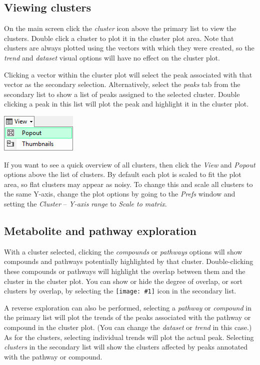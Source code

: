\documentclass[11pt,a4paper]{article}
\newcommand{\menu}[1]{ \flqq\textit{#1}\frqq}
\newcommand{\icon}[1]{\texttt{[image: \#1]}}
\begin{document}
\subsection{Viewing clusters}
On the main screen click the \menu{cluster} icon above the primary list to view the clusters. Double click a cluster to plot it in the cluster plot area. Note that clusters are always plotted using the vectors with which they were created, so the \menu{trend} and \menu{dataset} visual options will have no effect on the cluster plot.

Clicking a vector within the cluster plot will select the peak associated with that vector as the secondary selection. Alternatively, select the \menu{peaks} tab from the secondary list to show a list of peaks assigned to the selected cluster. Double clicking a peak in this list will plot the peak and highlight it in the cluster plot.

\begin{center}
\includegraphics{Images/userguide/popout}
\end{center}

If you want to see a quick overview of all clusters, then click the \menu{View} and \menu{Popout} options above the list of clusters. By default each plot is scaled to fit the plot area, so flat clusters may appear as noisy. To change this and scale all clusters to the same Y-axis, change the plot options by going to the \menu{Prefs} window and setting the \menu{Cluster} -- \menu{Y-axis range} to \menu{Scale to matrix}.

\subsection{Metabolite and pathway exploration}
With a cluster selected, clicking the \menu{compounds} or \menu{pathways} options will show compounds and pathways potentially highlighted by that cluster. Double-clicking these compounds or pathways will highlight the overlap between them and the cluster in the cluster plot. You can show or hide the degree of overlap, or sort clusters by overlap, by selecting the \icon{columns} icon in the secondary list.

A reverse exploration can also be performed, selecting a \menu{pathway} or \menu{compound} in the primary list will plot the trends of the peaks associated with the pathway or compound in the cluster plot. (You can change the \menu{dataset} or \menu{trend} in this case.) As for the clusters, selecting individual trends will plot the actual peak. Selecting \menu{clusters} in the secondary list will show the clusters affected by peaks annotated with the pathway or compound.
\end{document}
